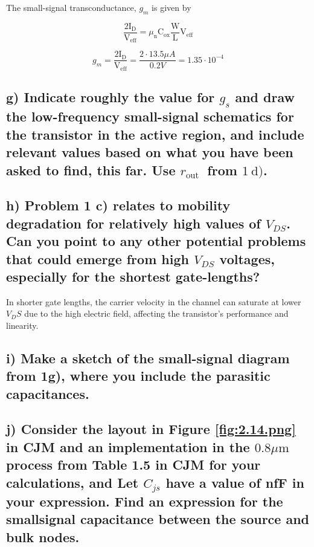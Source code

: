 The small-signal transconductance, \( g_{m} \) is given by 

\begin{equation*}
    \frac{2 \mathrm{I}_{\mathrm{D}}}{\mathrm{V}_{\mathrm{eff}}}=\mu_{\mathrm{n}} \mathrm{C}_{\mathrm{ox}} \frac{\mathrm{W}}{\mathrm{L}} \mathrm{V}_{\mathrm{eff}}
\end{equation*}

\begin{equation*}
    g_m=\frac{2 \mathrm{I}_{\mathrm{D}}}{\mathrm{V}_{\mathrm{eff}}}=\frac{2\cdot 13.5\mu A}{0.2V}=1.35\cdot10^{-4}
\end{equation*}

\subsection*{g) Indicate roughly the value for \( g_{s} \) and draw the low-frequency small-signal schematics for the transistor in the active region, and include relevant values based on what you have been asked to find, this far. Use \( r_{\text {out }} \) from \( 1 \mathrm{~d}) \).}


\subsection*{h) Problem 1 c) relates to mobility degradation for relatively high values of \( V_{D S} \). Can you point to any other potential problems that could emerge from high \( V_{D S} \) voltages, especially for the shortest gate-lengths?}

In shorter gate lengths, the carrier velocity in the channel can saturate at lower $V_DS$ due to the high electric field, affecting the transistor's performance and linearity.


\subsection*{i) Make a sketch of the small-signal diagram from 1g), where you include the parasitic capacitances.}

\subsection*{j) Consider the layout in Figure \ref{fig:2.14.png} in CJM and an implementation in the \( 0.8 \mu \mathrm{m} \) process from Table 1.5 in CJM for your calculations, and Let \( C_{j s} \) have a value of nfF in your expression. Find an expression for the smallsignal capacitance between the source and bulk nodes.}

